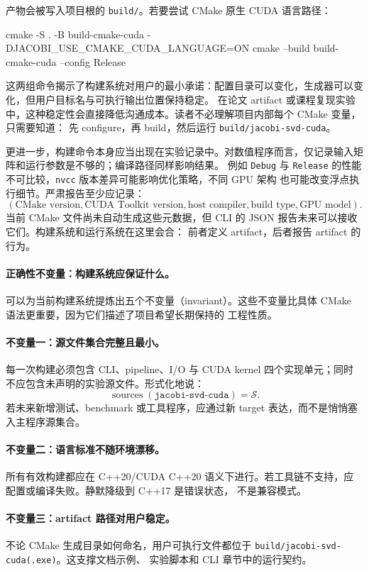 产物会被写入项目根的 \texttt{build/}。若要尝试 CMake 原生 CUDA 语言路径：
\begin{bashlisting}
    cmake -S . -B build-cmake-cuda -DJACOBI_USE_CMAKE_CUDA_LANGUAGE=ON
    cmake --build build-cmake-cuda --config Release
\end{bashlisting}

这两组命令揭示了构建系统对用户的最小承诺：配置目录可以变化，生成器可以变化，但用户目标名与可执行输出位置保持稳定。
在论文 artifact 或课程复现实验中，这种稳定性会直接降低沟通成本。读者不必理解项目内部每个 CMake 变量，只需要知道：
先 configure，再 build，然后运行 \texttt{build/jacobi-svd-cuda}。

更进一步，构建命令本身应当出现在实验记录中。对数值程序而言，仅记录输入矩阵和运行参数是不够的；编译路径同样影响结果。
例如 \texttt{Debug} 与 \texttt{Release} 的性能不可比较，\texttt{nvcc} 版本差异可能影响优化策略，不同 GPU 架构
也可能改变浮点执行细节。严肃报告至少应记录：
\[
    (\text{CMake version},\text{CUDA Toolkit version},\text{host compiler},
    \text{build type},\text{GPU model}).
\]
当前 CMake 文件尚未自动生成这些元数据，但 CLI 的 JSON 报告未来可以接收它们。构建系统和运行系统在这里会合：
前者定义 artifact，后者报告 artifact 的行为。

\paragraph{正确性不变量：构建系统应保证什么。}

可以为当前构建系统提炼出五个不变量（invariant）。这些不变量比具体 CMake 语法更重要，因为它们描述了项目希望长期保持的
工程性质。

\paragraph{不变量一：源文件集合完整且最小。}
每一次构建必须包含 CLI、pipeline、I/O 与 CUDA kernel 四个实现单元；同时不应包含未声明的实验源文件。形式化地说：
\[
    \operatorname{sources}(\texttt{jacobi-svd-cuda})=\mathcal{S}.
\]
若未来新增测试、benchmark 或工具程序，应通过新 target 表达，而不是悄悄塞入主程序源集合。

\paragraph{不变量二：语言标准不随环境漂移。}
所有有效构建都应在 C++20/CUDA C++20 语义下进行。若工具链不支持，应配置或编译失败。静默降级到 C++17 是错误状态，
不是兼容模式。

\paragraph{不变量三：artifact 路径对用户稳定。}
不论 CMake 生成目录如何命名，用户可执行文件都位于 \texttt{build/jacobi-svd-cuda(.exe)}。这支撑文档示例、
实验脚本和 CLI 章节中的运行契约。

